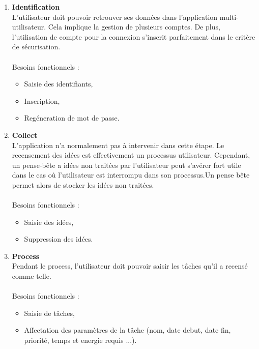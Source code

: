 \begin{enumerate} \renewcommand{\labelitemi}{$\bullet$}


\item \textbf{Identification}
\\L'utilisateur doit pouvoir retrouver ses données dans l'application multi-utilisateur. Cela implique la gestion de plusieurs comptes. De plus, l'utilisation de compte pour la connexion s'inscrit parfaitement dans le critère de sécurisation.
\\\\Besoins fonctionnels :	
	\begin{itemize}	\renewcommand{\labelitemi}{$\Rightarrow$}
	\item Saisie des identifiants,
	\item Inscription,
	\item Regéneration de mot de passe.\\
	\end{itemize}
	
\item \textbf{Collect}
\\L'application n'a normalement pas à intervenir dans cette étape. Le recensement des idées est effectivement un processus utilisateur. Cependant, un pense-bête a idées non traitées par l'utilisateur peut s'avérer fort utile dans le cas où l'utilisateur est interrompu dans son processus.Un pense bête permet alors de stocker les idées non traitées.
\\\\Besoins fonctionnels :
	\begin{itemize}	\renewcommand{\labelitemi}{$\Rightarrow$}
	\item Saisie des idées,
	\item Suppression des idées.\\
	\end{itemize}
	

\item \textbf{Process}
\\Pendant le process, l'utilisateur doit pouvoir saisir les tâches qu'il a recensé comme telle.
\\\\Besoins fonctionnels :
	\begin{itemize}	\renewcommand{\labelitemi}{$\Rightarrow$}
	\item Saisie de tâches,
	\item Affectation des paramètres de la tâche (nom, date debut, date fin, priorité, temps et energie requis ...).\\
	\end{itemize}
	

\end{enumerate}
